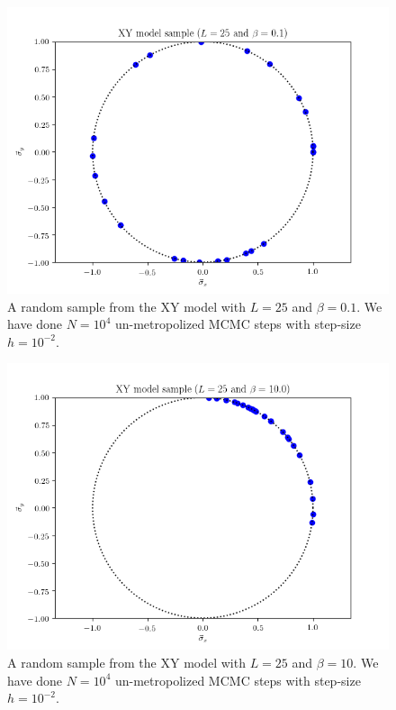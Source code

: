 \documentclass[11pt,a4paper]{amsart}
\begin{document}
\begin{figure}[H]
\centering
\includegraphics[width=5in]{sample_b1.png}
\caption{A random sample from the XY model with $L=25$ and $\beta = 0.1$.  We have done $N = 10^4$ un-metropolized MCMC steps with step-size $h = 10^{-2}$.}
\label{fig:sample_b1}
\end{figure}

\begin{figure}[H]
\centering
\includegraphics[width=5in]{sample_b10.png}
\caption{A random sample from the XY model with $L=25$ and $\beta = 10$.  We have done $N = 10^4$ un-metropolized MCMC steps with step-size $h = 10^{-2}$.}
\label{fig:sample_b10}
\end{figure}
\end{document}
